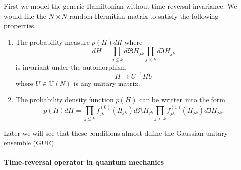 \documentclass[11pt, a4paper]{article}
\numberwithin{equation}{section}
\newcommand{\Unitary}{\mathrm{U}}
\theoremstyle{definition}
\theoremstyle{remark}
\begin{document}
First we model the generic Hamiltonian without time-reversal invariance. We would like the $N \times N$ random Hermitian matrix to satisfy the following properties.
\begin{enumerate}
\item \label{enu:condition_for_GUE:1}
  The probability measure $p(H) dH$ where
  \begin{equation}
    dH = \prod_{j \leq k} d \Re H_{jk} \prod_{j < k} d \Im H_{jk}
  \end{equation}
  is invariant under the automorphism
  \begin{equation}
    H \to U^{-1} H U
  \end{equation}
  where $U \in \Unitary(N)$ is any unitary matrix.
\item
  The probability density function $p(H)$ can be written into the form
  \begin{equation}
    p(H) dH = \prod_{j \leq k} f^{(0)}_{jk}(H_{jk}) d \Re H_{jk} \prod_{j < k} f^{(1)}_{jk}(H_{jk}) d \Im H_{jk}. 
  \end{equation}
\end{enumerate}
Later we will see that these conditions almost define the Gaussian unitary ensemble (GUE).

\paragraph{Time-reversal operator in quantum mechanics}
\end{document}
